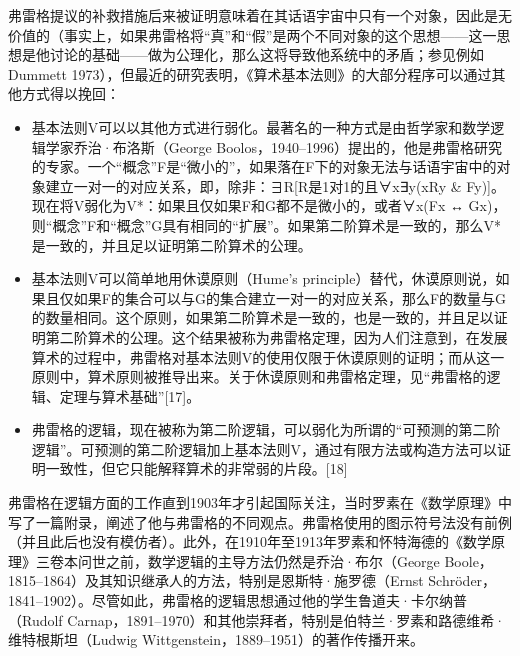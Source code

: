弗雷格提议的补救措施后来被证明意味着在其话语宇宙中只有一个对象，因此是无价值的（事实上，如果弗雷格将“真”和“假”是两个不同对象的这个思想——这一思想是他讨论的基础——做为公理化，那么这将导致他系统中的矛盾；参见例如Dummett 1973），但最近的研究表明，《算术基本法则》的大部分程序可以通过其他方式得以挽回：
\begin{itemize}
\item 基本法则V可以以其他方式进行弱化。最著名的一种方式是由哲学家和数学逻辑学家乔治·布洛斯（George Boolos，1940–1996）提出的，他是弗雷格研究的专家。一个“概念”F是“微小的”，如果落在F下的对象无法与话语宇宙中的对象建立一对一的对应关系，即，除非：∃R[R是1对1的且∀x∃y(xRy & Fy)]。现在将V弱化为V*：如果且仅如果F和G都不是微小的，或者∀x(Fx ↔ Gx)，则“概念”F和“概念”G具有相同的“扩展”。如果第二阶算术是一致的，那么V*是一致的，并且足以证明第二阶算术的公理。
\item 基本法则V可以简单地用休谟原则（Hume's principle）替代，休谟原则说，如果且仅如果F的集合可以与G的集合建立一对一的对应关系，那么F的数量与G的数量相同。这个原则，如果第二阶算术是一致的，也是一致的，并且足以证明第二阶算术的公理。这个结果被称为弗雷格定理，因为人们注意到，在发展算术的过程中，弗雷格对基本法则V的使用仅限于休谟原则的证明；而从这一原则中，算术原则被推导出来。关于休谟原则和弗雷格定理，见“弗雷格的逻辑、定理与算术基础”[17]。
\item 弗雷格的逻辑，现在被称为第二阶逻辑，可以弱化为所谓的“可预测的第二阶逻辑”。可预测的第二阶逻辑加上基本法则V，通过有限方法或构造方法可以证明一致性，但它只能解释算术的非常弱的片段。[18]
\end{itemize}
弗雷格在逻辑方面的工作直到1903年才引起国际关注，当时罗素在《数学原理》中写了一篇附录，阐述了他与弗雷格的不同观点。弗雷格使用的图示符号法没有前例（并且此后也没有模仿者）。此外，在1910年至1913年罗素和怀特海德的《数学原理》三卷本问世之前，数学逻辑的主导方法仍然是乔治·布尔（George Boole，1815–1864）及其知识继承人的方法，特别是恩斯特·施罗德（Ernst Schröder，1841–1902）。尽管如此，弗雷格的逻辑思想通过他的学生鲁道夫·卡尔纳普（Rudolf Carnap，1891–1970）和其他崇拜者，特别是伯特兰·罗素和路德维希·维特根斯坦（Ludwig Wittgenstein，1889–1951）的著作传播开来。
